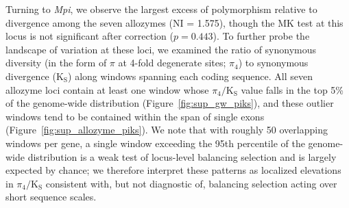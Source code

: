\documentclass[11pt]{article}
\begin{document}

Turning to \textit{Mpi}, we observe the largest excess of polymorphism relative to
divergence among the seven allozymes (NI = 1.575), though the MK test at this locus
is not significant after correction ($p = 0.443$).
To further probe the landscape of variation at these loci, we examined the ratio of
synonymous diversity (in the form of $\pi$ at 4-fold degenerate sites; $\pi_{4}$) to
synonymous divergence ($\text{K}_\text{S}$) along windows spanning each coding sequence.
All seven allozyme loci contain at least one window whose $\pi_{4}/\text{K}_\text{S}$
value falls in the top 5\% of the genome-wide distribution
(Figure~\ref{fig:sup_gw_piks}), and these outlier windows tend to be contained within
the span of single exons (Figure~\ref{fig:sup_allozyme_piks}).
We note that with roughly 50 overlapping windows per gene, a single window exceeding
the 95th percentile of the genome-wide distribution is a weak test of locus-level
balancing selection and is largely expected by chance; we therefore interpret these
patterns as localized elevations in $\pi_{4}/\text{K}_\text{S}$ consistent with, but
not diagnostic of, balancing selection acting over short sequence scales.
\vspace{0.2cm}
\end{document}
